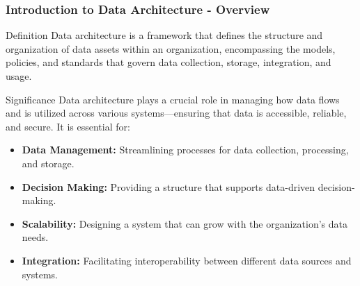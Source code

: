 \documentclass[aspectratio=169]{beamer}
\begin{document}
\begin{frame}[fragile]
    \frametitle{Introduction to Data Architecture - Overview}
    \begin{block}{Definition}
        Data architecture is a framework that defines the structure and organization of data assets within an organization, encompassing the models, policies, and standards that govern data collection, storage, integration, and usage.
    \end{block}

    \begin{block}{Significance}
        Data architecture plays a crucial role in managing how data flows and is utilized across various systems—ensuring that data is accessible, reliable, and secure. It is essential for:
        \begin{itemize}
            \item \textbf{Data Management:} Streamlining processes for data collection, processing, and storage.
            \item \textbf{Decision Making:} Providing a structure that supports data-driven decision-making.
            \item \textbf{Scalability:} Designing a system that can grow with the organization’s data needs.
            \item \textbf{Integration:} Facilitating interoperability between different data sources and systems.
        \end{itemize}
    \end{block}
\end{frame}
\end{document}
